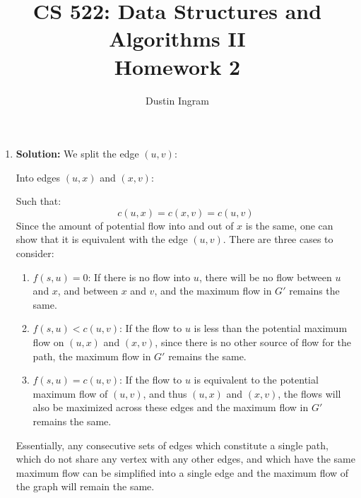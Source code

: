 \documentclass{article}
\title{CS 522: Data Structures and Algorithms II \\ Homework 2}
\author{Dustin Ingram}
\begin{document}
\maketitle
\begin{enumerate}
    \item \textbf{Solution:}
    We split the edge $(u,v)$:
    \begin{figure}[H]
    \centering
    \end{figure}
    Into edges $(u,x)$ and $(x,v)$:
    \begin{figure}[H]
    \centering
    \end{figure}
    Such that:
    $$ c(u,x) = c(x,v) = c(u,v) $$
    Since the amount of potential flow into and out of $x$ is the same, one can
    show that it is equivalent with the edge $(u,v)$. There are three cases to
    consider:
    \begin{enumerate}
        \item \textbf{$f(s,u) = 0$}: If there is no flow into $u$, there will be
        no flow between $u$ and $x$, and between $x$ and $v$, and the maximum
        flow in $G'$ remains the same.
        \item \textbf{$f(s,u) < c(u,v)$}: If the flow to $u$ is less than the
        potential maximum flow on $(u,x)$ and $(x,v)$, since there is no other
        source of flow for the path, the maximum flow in $G'$ remains the same.
        \item \textbf{$f(s,u) = c(u,v)$}: If the flow to $u$ is equivalent to
        the potential maximum flow of $(u,v)$, and thus $(u,x)$ and $(x,v)$, the
        flows will also be maximized across these edges and the maximum flow in
        $G'$ remains the same.
    \end{enumerate}
    Essentially, any consecutive sets of edges which constitute a single path,
    which do not share any vertex with any other edges, and which have the same
    maximum flow can be simplified into a single edge and the maximum flow of
    the graph will remain the same.


\end{enumerate}
\end{document}
